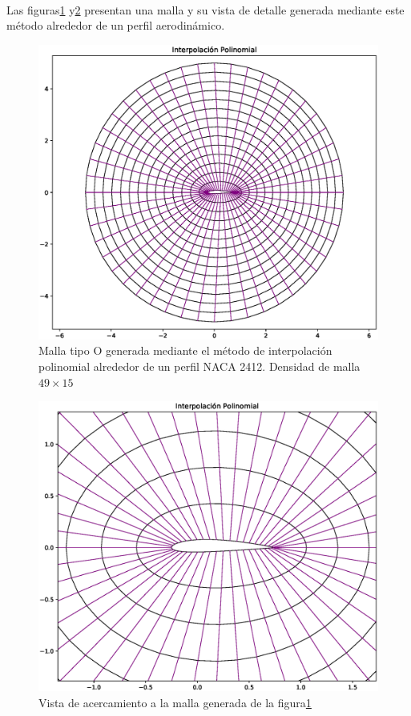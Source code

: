 \documentclass[letterpaper, openright, 12pt]{book}
\begin{document}
    \paragraph*{}
        Las figuras\ref{fig:malla-inter} y\ref{fig:malla-inter-cerca}
        presentan una malla y su vista de detalle generada mediante este método
        alrededor de un perfil aerodinámico.
        \begin{figure}[htbp!]
            \centering
            \includegraphics[keepaspectratio, width=120mm]{./Imagenes/M-inter_pol}
            \captionsetup{justification=centering, margin=2cm}
            \caption[Malla Interpolación Polinomial]{Malla tipo O generada
            mediante el método de interpolación polinomial alrededor de un
            perfil NACA 2412. Densidad de malla $49\times15$}
            \label{fig:malla-inter}
        \end{figure}
        \begin{figure}[htbp!]
            \centering
            \includegraphics[width=120mm]{./Imagenes/M-inter_pol_cerca}
            \captionsetup{justification=centering, margin=2cm}
            \caption[Malla Interpolación Polinomial Acercamiento]{Vista de
            acercamiento a la malla generada de la figura\ref{fig:malla-inter}}
            \label{fig:malla-inter-cerca}
        \end{figure}
\end{document}
